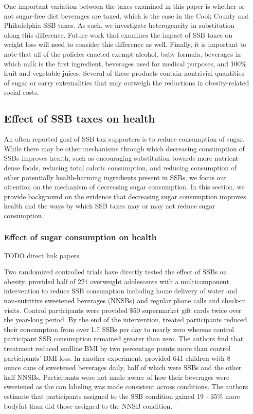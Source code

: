 \documentclass[12pt]{article}
\begin{document}
One important variation between the taxes examined in this paper is whether or not sugar-free diet beverages are taxed, which is the case in the Cook County and Philadelphia SSB taxes. As such, we investigate heterogeneity in substitution along this difference. Future work that examines the impact of SSB taxes on weight loss will need to consider this difference as well. Finally, it is important to note that all of the policies enacted exempt alcohol, baby formula, beverages in which milk is the first ingredient, beverages used for medical purposes, and 100\% fruit and vegetable juices. Several of these products contain nontrivial quantities of sugar or carry externalities that may outweigh the reductions in obesity-related social costs.

\subsection{Effect of SSB taxes on health}

An often reported goal of SSB tax supporters is to reduce consumption of sugar. While there may be other mechanisms through which decreasing consumption of SSBs improves health, such as encouraging substitution towards more nutrient-dense foods, reducing total caloric consumption, and reducing consumption of other potentially health-harming ingredients present in SSBs, we focus our attention on the mechanism of decreasing sugar consumption. In this section, we provide background on the evidence that decreasing sugar consumption improves health and the ways by which SSB taxes may or may not reduce sugar consumption.

\subsubsection{Effect of sugar consumption on health}

TODO direct link papers

Two randomized controlled trials have directly tested the effect of SSBs on obesity. \textcite{ebbeling2012randomized} provided half of 224 overweight adolescents with a multicomponent intervention to reduce SSB consumption including home delivery of water and non-nutritive sweetened beverages (NNSBs) and regular phone calls and check-in visits. Control participants were provided \$50 supermarket gift cards twice over the year-long period. By the end of the intervention, treated participants reduced their consumption from over 1.7 SSBs per day to nearly zero whereas control participant SSB consumption remained greater than zero. The authors find that treatment reduced endline BMI by two percentage points more than control participants' BMI loss. In another experiment, \textcite{de2012trial} provided 641 children with 8 ounce cans of sweetened beverages daily, half of which were SSBs and the other half NNSBs. Participants were not made aware of how their beverages were sweetened as the can labeling was made consistent across conditions. The authors estimate that participants assigned to the SSB condition gained 19 - 35\% more bodyfat than did those assigned to the NNSB condition.
\end{document}
